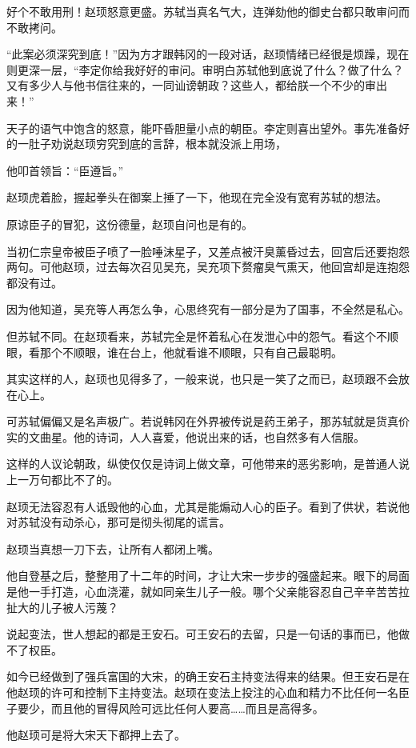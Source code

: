 好个不敢用刑！赵顼怒意更盛。苏轼当真名气大，连弹劾他的御史台都只敢审问而不敢拷问。

“此案必须深究到底！”因为方才跟韩冈的一段对话，赵顼情绪已经很是烦躁，现在则更深一层，“李定你给我好好的审问。审明白苏轼他到底说了什么？做了什么？又有多少人与他书信往来的，一同讪谤朝政？这些人，都给朕一个不少的审出来！”

天子的语气中饱含的怒意，能吓昏胆量小点的朝臣。李定则喜出望外。事先准备好的一肚子劝说赵顼穷究到底的言辞，根本就没派上用场，

他叩首领旨：“臣遵旨。”

赵顼虎着脸，握起拳头在御案上捶了一下，他现在完全没有宽宥苏轼的想法。

原谅臣子的冒犯，这份德量，赵顼自问也是有的。

当初仁宗皇帝被臣子喷了一脸唾沫星子，又差点被汗臭薰昏过去，回宫后还要抱怨两句。可他赵顼，过去每次召见吴充，吴充项下赘瘤臭气熏天，他回宫却是连抱怨都没有过。

因为他知道，吴充等人再怎么争，心思终究有一部分是为了国事，不全然是私心。

但苏轼不同。在赵顼看来，苏轼完全是怀着私心在发泄心中的怨气。看这个不顺眼，看那个不顺眼，谁在台上，他就看谁不顺眼，只有自己最聪明。

其实这样的人，赵顼也见得多了，一般来说，也只是一笑了之而已，赵顼跟不会放在心上。

可苏轼偏偏又是名声极广。若说韩冈在外界被传说是药王弟子，那苏轼就是货真价实的文曲星。他的诗词，人人喜爱，他说出来的话，也自然多有人信服。

这样的人议论朝政，纵使仅仅是诗词上做文章，可他带来的恶劣影响，是普通人说上一万句都比不了的。

赵顼无法容忍有人诋毁他的心血，尤其是能煽动人心的臣子。看到了供状，若说他对苏轼没有动杀心，那可是彻头彻尾的谎言。

赵顼当真想一刀下去，让所有人都闭上嘴。

他自登基之后，整整用了十二年的时间，才让大宋一步步的强盛起来。眼下的局面是他一手打造，心血浇灌，就如同亲生儿子一般。哪个父亲能容忍自己辛辛苦苦拉扯大的儿子被人污蔑？

说起变法，世人想起的都是王安石。可王安石的去留，只是一句话的事而已，他做不了权臣。

如今已经做到了强兵富国的大宋，的确王安石主持变法得来的结果。但王安石是在他赵顼的许可和控制下主持变法。赵顼在变法上投注的心血和精力不比任何一名臣子要少，而且他的冒得风险可远比任何人要高……而且是高得多。

他赵顼可是将大宋天下都押上去了。

